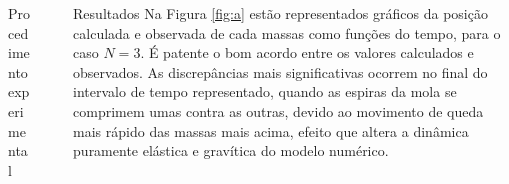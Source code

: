 \documentclass[final]{beamer}
\newlength{\sepwidth}
\newlength{\colwidth}
\newcommand{\separatorcolumn}{\begin{column}{\sepwidth}\end{column}}
\begin{document}
\begin{frame}[t]
\begin{columns}[t]
\begin{column}{\colwidth}
\begin{block}{Procedimento experimental}
\end{block}
\end{column}
\separatorcolumn
\begin{column}{\colwidth}
\begin{block}{Resultados}
	Na Figura \ref{fig:a} estão representados gráficos da posição calculada e observada de
	cada massas como funções do tempo, para o caso $N=3$. É patente o bom acordo
	entre os valores calculados e observados. As discrepâncias mais significativas
	ocorrem no final do intervalo de tempo representado, quando as espiras da mola
	se comprimem umas contra as outras, devido ao movimento de queda mais rápido das
	massas mais acima, efeito que altera a dinâmica puramente elástica e gravítica
	do modelo numérico.
	

\end{block}
\end{column}
\end{columns}
\end{frame}
\end{document}
